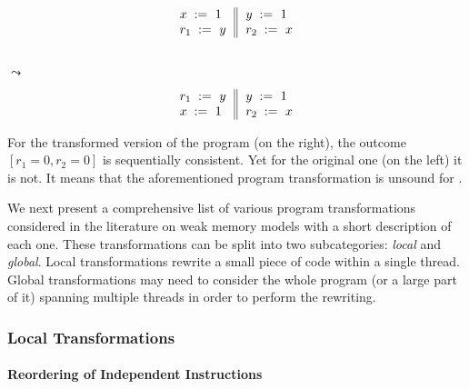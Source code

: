 \begin{minipage}{0.45\linewidth}
\begin{equation*}
\inarrII{
   \writeInst{}{x}{1}   \\
   \readInst{}{r_1}{y}  \\
}{
  \writeInst{}{y}{1}   \\
  \readInst{}{r_2}{x}  \\
}
\end{equation*}
\end{minipage}\hfill%
\begin{minipage}{0.05\linewidth}
\Large~\\ $\leadsto$
\end{minipage}\hfill%
\begin{minipage}{0.45\linewidth}
\begin{equation*}
\inarrII{
   \readInst{}{r_1}{y}  \\
   \writeInst{}{x}{1}   \\
}{
  \writeInst{}{y}{1}   \\
  \readInst{}{r_2}{x}  \\
}
\end{equation*}
\end{minipage}

For the transformed version of the program (on the right),
the outcome $[r_1=0, r_2=0]$ is sequentially consistent.
Yet for the original one (on the left) it is not. 
It means that the aforementioned program transformation
is unsound for \SC. 

We next present a comprehensive list of 
various program transformations considered in
the literature on weak memory models 
with a short description of each one.
These transformations can be split into 
two subcategories: \emph{local} and \emph{global}.
Local transformations rewrite a small 
piece of code within a single thread.
Global transformations may need to consider 
the whole program (or a large part of it) 
spanning multiple threads in order 
to perform the rewriting.       
 
\subsubsection{Local Transformations}

\paragraph{Reordering of Independent Instructions} 

